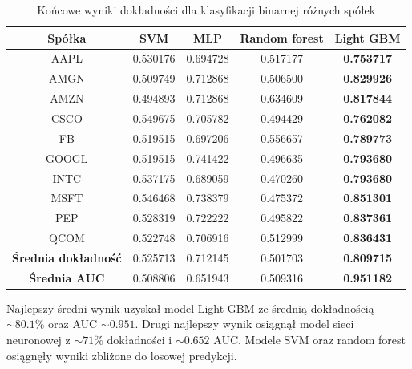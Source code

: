 \documentclass[a4paper, twoside, 11pt, openright]{article}
\begin{document}
 \begin{table}[H]
    \centering
    \begin{tabular}{|c|c|c|c|c|}
    \hline
        \textbf{Spółka} & \textbf{SVM} &  \textbf{MLP}  &  \textbf{Random forest}  &  \textbf{Light GBM} \\ \hline
AAPL   &  0.530176 & 0.694728  & 0.517177 & \textbf{0.753717}\\ \hline
AMGN   &  0.509749 &  0.712868 & 0.506500 &  \textbf{0.829926} \\ \hline
AMZN   &  0.494893 & 0.712868 & 0.634609 & \textbf{0.817844} \\ \hline
CSCO   &  0.549675 &  0.705782 & 0.494429 &  \textbf{0.762082} \\ \hline
FB     &  0.519515 & 0.697206 & 0.556657 & \textbf{0.789773} \\ \hline
GOOGL  &  0.519515 &  0.741422 & 0.496635 & \textbf{0.793680} \\ \hline
INTC   &  0.537175 & 0.689059  & 0.470260 & \textbf{0.793680} \\ \hline
MSFT   &  0.546468 & 0.738379 & 0.475372 &  \textbf{0.851301}\\ \hline
PEP    &  0.528319 & 0.722222  & 0.495822 & \textbf{0.837361} \\ \hline
QCOM   &  0.522748 &  0.706916 & 0.512999 & \textbf{0.836431} \\ \hline \hline
\textbf{Średnia dokładność} &  0.525713 & 0.712145 & 0.501703 & \textbf{0.809715} \\  \hline  
\textbf{Średnia AUC} &  0.508806 & 0.651943 & 0.509316 & \textbf{0.951182} \\  \hline
    \end{tabular}
    \caption{Końcowe wyniki dokładności dla klasyfikacji binarnej różnych spółek}
    \label{tab:comparison_final_binary}
\end{table}   

Najlepszy średni wynik uzyskał model Light GBM ze średnią dokładnością $\sim 80.1\%$ oraz AUC $\sim 0.951$. Drugi najlepszy wynik osiągnął model sieci neuronowej z $\sim 71\%$ dokładności i $\sim 0.652$ AUC. Modele SVM oraz random forest osiągnęły wyniki zbliżone do losowej predykcji.
\end{document}
